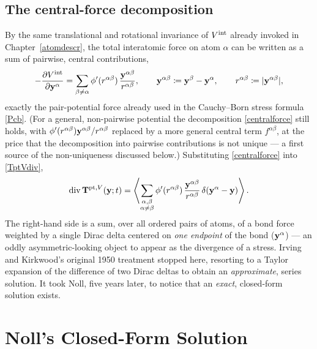 \subsection*{The central-force decomposition}

By the same translational and rotational invariance of $V^{\rm int}$ already invoked in Chapter~\ref{atomdescr}, the total interatomic force on atom $\alpha$ can be written as a sum of pairwise, central contributions,
\begin{equation}\label{centralforce}
	-\frac{\partial V^{\rm int}}{\partial\mathbf{y}^\alpha} = \sum_{\beta\neq\alpha}\phi'(r^{\alpha\beta})\,\frac{\mathbf{y}^{\alpha\beta}}{r^{\alpha\beta}}, \qquad \mathbf{y}^{\alpha\beta}\coloneqq\mathbf{y}^\beta-\mathbf{y}^\alpha, \qquad r^{\alpha\beta}\coloneqq|\mathbf{y}^{\alpha\beta}|,
\end{equation}
exactly the pair-potential force already used in the Cauchy--Born stress formula \eqref{Pcb}. (For a general, non-pairwise potential the decomposition \eqref{centralforce} still holds, with $\phi'(r^{\alpha\beta})\mathbf{y}^{\alpha\beta}/r^{\alpha\beta}$ replaced by a more general central term $f^{\alpha\beta}$, at the price that the decomposition into pairwise contributions is not unique --- a first source of the non-uniqueness discussed below.) Substituting \eqref{centralforce} into \eqref{TptVdiv},
\begin{equation}\label{TptVsum}
	\operatorname{div}\mathbf{T}^{{\rm pt},V}(\mathbf{y};t) = \left\langle \sum_{\substack{\alpha,\beta\\\alpha\neq\beta}} \phi'(r^{\alpha\beta})\,\frac{\mathbf{y}^{\alpha\beta}}{r^{\alpha\beta}}\,\delta(\mathbf{y}^\alpha-\mathbf{y})\right\rangle.
\end{equation}
The right-hand side is a sum, over all ordered pairs of atoms, of a bond force weighted by a single Dirac delta centered on \textit{one endpoint} of the bond ($\mathbf{y}^\alpha$) --- an oddly asymmetric-looking object to appear as the divergence of a stress. Irving and Kirkwood's original 1950 treatment stopped here, resorting to a Taylor expansion of the difference of two Dirac deltas to obtain an \textit{approximate}, series solution. It took Noll, five years later, to notice that an \textit{exact}, closed-form solution exists.

\section{Noll's Closed-Form Solution}\label{sec:Noll}

